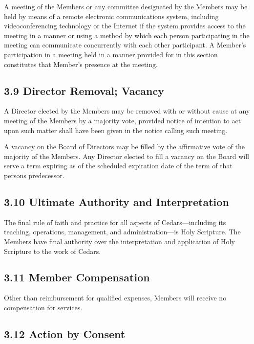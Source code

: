 \documentclass[
]{book}
\begin{document}
A meeting of the Members or any committee designated by the Members
may be held by means of a remote electronic communications system,
including videoconferencing technology or the Internet if the system
provides access to the meeting in a manner or using a method by which
each person participating in the meeting can communicate concurrently
with each other participant. A Member's participation in a meeting
held in a manner provided for in this section constitutes that
Member's presence at the meeting.

\subsection{3.9 Director Removal; Vacancy}\label{director-removal-vacancy}

A Director elected by the Members may be removed with or without cause
at any meeting of the Members by a majority vote, provided notice of
intention to act upon such matter shall have been given in the notice
calling such meeting.

A vacancy on the Board of Directors may be filled by the affirmative
vote of the majority of the Members. Any Director elected to fill a
vacancy on the Board will serve a term expiring as of the scheduled
expiration date of the term of that person\textquotesingle s predecessor.

\subsection{3.10 Ultimate Authority and Interpretation}\label{ultimate-authority-and-interpretation}

The final rule of faith and practice for all aspects of
Cedars---including its teaching, operations, management, and
administration---is Holy Scripture. The Members have final authority
over the interpretation and application of Holy Scripture to the work
of Cedars.

\subsection{3.11 Member Compensation}\label{member-compensation}

Other than reimbursement for qualified expenses, Members will receive
no compensation for services.

\subsection{3.12 Action by Consent}\label{action-by-consent}
\end{document}
